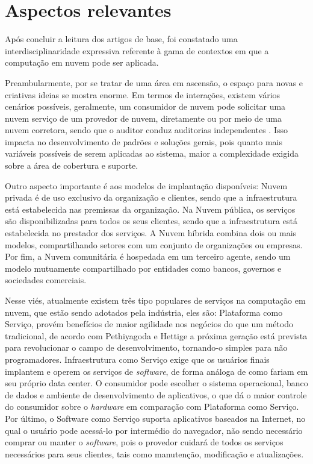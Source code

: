 \documentclass[12pt]{article}
\begin{document}
\section{Aspectos relevantes}
Após concluir a leitura dos artigos de base, foi constatado uma interdisciplinaridade expressiva referente à gama de contextos em que a computação em nuvem pode ser aplicada.

Preambularmente, por se tratar de uma área em ascensão, o espaço para novas e criativas ideias se mostra enorme. Em termos de interações, existem vários cenários possíveis, geralmente, um consumidor de nuvem pode solicitar uma nuvem serviço de um provedor de nuvem, diretamente ou por meio de uma nuvem corretora, sendo que o auditor conduz auditorias independentes \cite{donno}. Isso impacta no desenvolvimento de padrões e soluções gerais, pois quanto mais variáveis possíveis de serem aplicadas ao sistema, maior a complexidade exigida sobre a área de cobertura e suporte.

Outro aspecto importante é aos modelos de implantação disponíveis: Nuvem privada é de uso exclusivo da organização e clientes, sendo que a infraestrutura está estabelecida nas premissas da organização. Na Nuvem pública, os serviços são disponibilizadas para todos os seus clientes, sendo que a infraestrutura está estabelecida no prestador dos serviços. A Nuvem híbrida combina dois ou mais modelos, compartilhando setores com um conjunto de organizações ou empresas. Por fim, a Nuvem comunitária é hospedada em um terceiro agente, sendo um modelo mutuamente compartilhado por entidades como bancos, governos e sociedades comerciais. 

Nesse viés, atualmente existem três tipo populares de serviços na computação em nuvem, que estão sendo adotados pela indústria, eles são: Plataforma como Serviço, provém benefícios de maior agilidade nos negócios do que um método tradicional, de acordo com Pethiyagoda e Hettige a próxima geração está prevista para revolucionar o campo de desenvolvimento, tornando-o simples para não programadores. Infraestrutura como Serviço exige que os usuários finais implantem e operem os serviços de \emph{software}, de forma análoga de como fariam em seu próprio data center. O consumidor pode escolher o sistema operacional, banco de dados e ambiente de desenvolvimento de aplicativos, o que dá o maior controle do consumidor sobre o \emph{hardware} em comparação com Plataforma como Serviço. Por último, o Software como Serviço suporta aplicativos baseados na Internet, no qual o usuário pode acessá-lo por intermédio do navegador, não sendo necessário comprar ou manter o \emph{software}, pois o provedor cuidará de todos os serviços necessários para seus clientes, tais como manutenção, modificação e atualizações.
\end{document}
